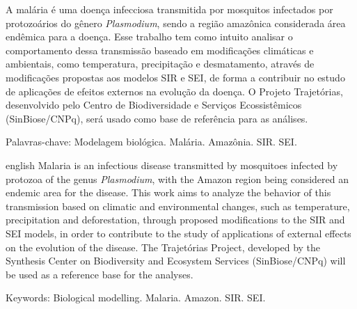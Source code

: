 \setlength{\absparsep}{18pt} 
\begin{resumo}[Resumo]
    A malária é uma doença infecciosa transmitida por mosquitos infectados por protozoários do gênero \textit{Plasmodium}, sendo a região amazônica considerada área endêmica 
    para a doença. Esse trabalho tem como intuito analisar o comportamento dessa transmissão baseado em modificações climáticas e ambientais, como temperatura, precipitação e desmatamento, 
    através de modificações propostas aos modelos SIR e SEI, de forma a contribuir no estudo de aplicações 
    de efeitos externos na evolução da doença. 
    O Projeto Trajetórias, desenvolvido pelo Centro de Biodiversidade e Serviços Ecossistêmicos (SinBiose/CNPq), será usado como base de referência para as análises.
    

 Palavras-chave: Modelagem biológica. Malária. Amazônia. SIR. SEI.
\end{resumo}

\begin{resumo}[Abstract]
 \begin{otherlanguage*}{english}
    Malaria is an infectious disease transmitted by mosquitoes infected by protozoa of the genus \textit{Plasmodium}, with the Amazon region being considered an endemic area 
    for the disease. This work aims to analyze the behavior of this transmission based on climatic and environmental changes, such as temperature, precipitation and deforestation, through proposed 
    modifications to the SIR and SEI models, in order to contribute to the study of applications
    of external effects on the evolution of the disease. 
    The Trajetórias Project, developed by the Synthesis Center 
    on Biodiversity and Ecosystem Services (SinBiose/CNPq) will be used as a reference base for the analyses.
    
 \end{otherlanguage*}

 Keywords: Biological modelling. Malaria. Amazon. SIR. SEI.
\end{resumo}